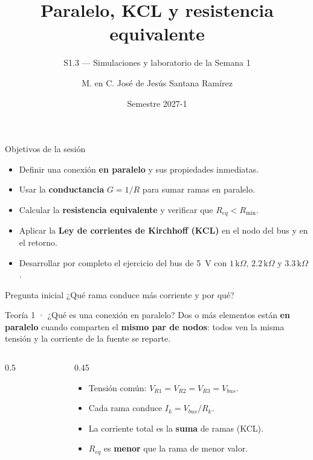 \documentclass[aspectratio=169]{beamer}
\title[Paralelo y KCL]{Paralelo, KCL y resistencia equivalente}
\subtitle{S1.3 — Simulaciones y laboratorio de la Semana 1}
\institute{Licenciatura en Ingeniería Aeroespacial\\ UNAM · ENES Unidad Juriquilla}
\author{M. en C. José de Jesús Santana Ramírez}
\date{Semestre 2027-1}
\begin{document}
\begin{frame}[plain]
  \titlepage
\end{frame}

\begin{frame}{Objetivos de la sesión}
  \begin{itemize}
    \item Definir una conexión \textbf{en paralelo} y sus propiedades inmediatas.
    \item Usar la \textbf{conductancia} $G = 1/R$ para sumar ramas en paralelo.
    \item Calcular la \textbf{resistencia equivalente} y verificar que $R_{eq} < R_{\min}$.
    \item Aplicar la \textbf{Ley de corrientes de Kirchhoff (KCL)} en el nodo del bus y en el retorno.
    \item Desarrollar por completo el ejercicio del bus de \SI{5}{\volt} con
      $1\,\text{k}\Omega$, $2.2\,\text{k}\Omega$ y $3.3\,\text{k}\Omega$.
  \end{itemize}
  \pause
  \begin{block}{Pregunta inicial}
    ¿Qué rama conduce más corriente y por qué?
  \end{block}
\end{frame}

\begin{frame}{Teoría 1 · ¿Qué es una conexión en paralelo?}
  Dos o más elementos están \textbf{en paralelo} cuando comparten el \textbf{mismo
  par de nodos}: todos ven la misma tensión y la corriente de la fuente se reparte.

  \begin{columns}[T]
    \begin{column}{0.5\textwidth}
    \end{column}
    \begin{column}{0.45\textwidth}
      \begin{itemize}
        \item Tensión común: $V_{R1} = V_{R2} = V_{R3} = V_{bus}$.
        \item Cada rama conduce $I_k = V_{bus}/R_k$.
        \item La corriente total es la \textbf{suma} de ramas (KCL).
        \item $R_{eq}$ es \textbf{menor} que la rama de menor valor.
      \end{itemize}
    \end{column}
  \end{columns}
\end{frame}
\end{document}
